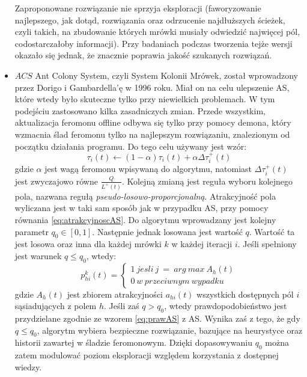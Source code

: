 \documentclass[printmode, openany, oneside, eng]{mgr}
\begin{document}
\begin{itemize}
\newline Zaproponowane rozwiązanie nie sprzyja eksploracji (faworyzowanie najlepszego, jak dotąd, rozwiązania oraz odrzucenie najdłuższych ścieżek, czyli takich, na zbudowanie których mrówki musiały odwiedzić najwięcej pól, codostarczałoby informacji). Przy badaniach podczas tworzenia tejże wersji okazało się jednak, że znacznie poprawia jakość szukanych rozwiązań.
\item \textbf{$ACS$}
\newline Ant Colony System, czyli System Kolonii Mrówek, został wprowadzony przez Dorigo i Gambardella'ę w 1996 roku. Miał on na celu ulepszenie AS, które wtedy było skuteczne tylko przy niewielkich problemach. W tym podejściu zastosowano kilka zasadniczych zmian.
\newline Przede wszystkim, aktualizacja feromonu offline odbywa się tylko przy pomocy demona, który wzmacnia ślad feromonu tylko na najlepszym rozwiązaniu, znalezionym od początku działania programu. Do tego celu używany jest wzór:
\newline
\begin{equation}
\tau_{i}(t)  \leftarrow (1-\alpha)\tau_{i}(t) + \alpha \Delta \tau_i^+(t)
\end{equation}
\newline gdzie $\alpha$ jest wagą feromonu wpisywaną do algorytmu, natomiast $ \Delta \tau_i^+(t)$ jest zwyczajowo równe $ \frac{Q}{L^+(t)}$.
Kolejną zmianą jest reguła wyboru kolejnego pola, nazwana regułą \textit{pseudo-losowo-proporcjonalną}. Atrakcyjność pola wyliczana jest w taki sam sposób jak w przypadku AS, przy pomocy równania \ref{eq:atrakcyjnoscAS}. Do algorytmu wprowadzany jest kolejny parametr $q_0 \in [0,1]$. Następnie jednak losowana jest wartość $q$. Wartość ta jest losowa oraz inna dla każdej mrówki $k$ w każdej iteracji $i$. Jeśli spełniony jest warunek $q \leq q_0$, wtedy:
\newline
\begin{equation}
p^k_{hi}(t) = 
\begin{cases}
1\ jesli\ j\ =\ arg\ max\ A_{h} (t) 
\\ 0 \ w\ przeciwnym\ wypadku 
 \end{cases}
\end{equation}
\newline
gdzie $A_{h} (t) $ jest zbiorem atrakcyjności $a_{hi}(t)$ wszystkich dostępnych pól $i$ sąsiadujących z polem $h$.
\newline
Jeśli zaś $q>q_0$, wtedy prawdopodobieństwo jest przydzielane zgodnie ze wzorem \ref{eq:prawAS} z AS. Wynika zaś z tego, że gdy $q \leq q_0$, algorytm wybiera bezpieczne rozwiązanie, bazujące na heurystyce oraz historii zawartej w śladzie feromonowym. Dzięki dopasowywaniu $q_0$ można zatem modulować poziom eksploracji względem korzystania z dostępnej wiedzy.

\end{itemize}
\end{document}
